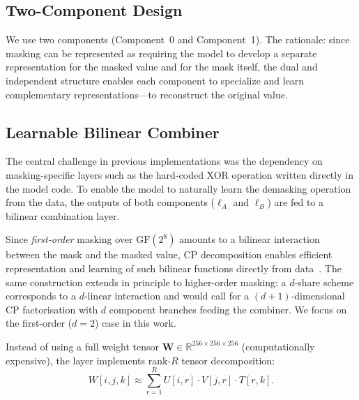 \documentclass[runningheads]{llncs}
\newcommand{\GF}{\mathrm{GF}}
\begin{document}
\subsection{Two-Component Design}

We use two components (Component~0 and Component~1).
The rationale: since masking can be represented as requiring the model to develop a separate representation for the masked value and for the mask itself, the dual and independent structure enables each component to specialize and learn complementary representations---to reconstruct the original value.

\subsection{Learnable Bilinear Combiner}\label{sec:bilinear}

The central challenge in previous implementations was the dependency on masking-specific layers such as the hard-coded XOR operation written directly in the model code.
To enable the model to naturally learn the demasking operation from the data, the outputs of both components ($\bm{\ell}_A$ and $\bm{\ell}_B$) are fed to a bilinear combination layer.

Since \emph{first-order} masking over $\GF(2^8)$ amounts to a bilinear interaction between the mask and the masked value, CP decomposition enables efficient representation and learning of such bilinear functions directly from data~\cite{kolda2009tensor}.
The same construction extends in principle to higher-order masking: a $d$-share scheme corresponds to a $d$-linear interaction and would call for a $(d{+}1)$-dimensional CP factorisation with $d$ component branches feeding the combiner.
We focus on the first-order ($d{=}2$) case in this work.

Instead of using a full weight tensor $\bm{W} \in \mathbb{R}^{256 \times 256 \times 256}$ (computationally expensive), the layer implements rank-$R$ tensor decomposition:
\begin{equation}\label{eq:cpd}
  W[i,j,k] \approx \sum_{r=1}^{R} U[i,r] \cdot V[j,r] \cdot T[r,k].
\end{equation}
\end{document}
